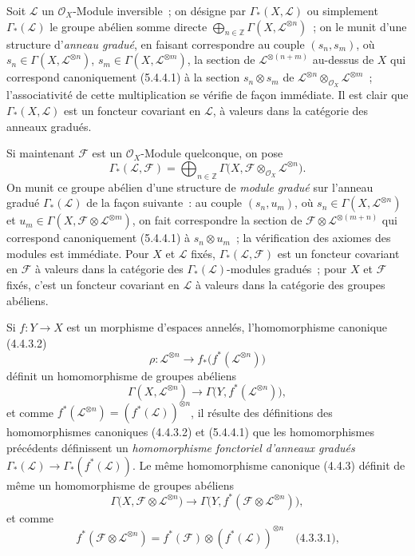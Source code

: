 \begin{env}[5.4.6]
\label{0.5.4.6-fr}
Soit $\mathcal{L}$ un $\mathcal{O}_X$-Module inversible~; on désigne par
$\Gamma_*(X,\mathcal{L})$ ou simplement $\Gamma_*(\mathcal{L})$ le groupe
abélien somme directe
$\bigoplus_{n\in\mathbb{Z}}\Gamma(X,\mathcal{L}^{\otimes n})$~; on le munit
d'une structure d'\emph{anneau gradué}, en faisant correspondre au couple
$(s_n,s_m)$, où $s_n\in\Gamma(X,\mathcal{L}^{\otimes n})$,
$s_m\in\Gamma(X,\mathcal{L}^{\otimes m})$, la section de
$\mathcal{L}^{\otimes(n+m)}$ au-dessus de $X$ qui correspond canoniquement
(5.4.4.1) à la section $s_n\otimes s_m$ de
$\mathcal{L}^{\otimes n}\otimes_{\mathcal{O}_X}\mathcal{L}^{\otimes m}$~;
l'associativité de cette multiplication se vérifie de façon immédiate. Il est
clair que $\Gamma_*(X,\mathcal{L})$ est un foncteur covariant en
$\mathcal{L}$, à valeurs dans la catégorie des anneaux gradués.

Si maintenant $\mathcal{F}$ est un $\mathcal{O}_X$-Module quelconque, on pose
\[
  \Gamma_*(\mathcal{L},\mathcal{F})
  =\bigoplus_{n\in\mathbb{Z}}
   \Gamma\bigl(X,
     \mathcal{F}\otimes_{\mathcal{O}_X}\mathcal{L}^{\otimes n}\bigr).
\]
On munit ce groupe abélien d'une structure de \emph{module gradué} sur
l'anneau gradué $\Gamma_*(\mathcal{L})$ de la façon suivante~: au couple
$(s_n,u_m)$, où $s_n\in\Gamma(X,\mathcal{L}^{\otimes n})$ et
$u_m\in\Gamma(X,
\mathcal{F}\otimes\mathcal{L}^{\otimes m})$, on fait
correspondre la section de
$\mathcal{F}\otimes\mathcal{L}^{\otimes(m+n)}$ qui correspond
canoniquement (5.4.4.1) à $s_n\otimes u_m$~; la vérification des axiomes des
modules est immédiate. Pour $X$ et $\mathcal{L}$ fixés,
$\Gamma_*(\mathcal{L},\mathcal{F})$ est un foncteur covariant en
$\mathcal{F}$ à valeurs dans la catégorie des
$\Gamma_*(\mathcal{L})$-modules gradués~; pour $X$ et $\mathcal{F}$ fixés,
c'est un foncteur covariant en $\mathcal{L}$ à valeurs dans la catégorie des
groupes abéliens.

Si $f:Y\to X$ est un morphisme d'espaces annelés, l'homomorphisme canonique
(4.4.3.2)
\[
  \rho:\mathcal{L}^{\otimes n}
  \longrightarrow
  f_*\bigl(f^*(\mathcal{L}^{\otimes n})\bigr)
\]
définit un homomorphisme de groupes abéliens
\[
  \Gamma(X,\mathcal{L}^{\otimes n})
  \longrightarrow
  \Gamma\bigl(Y,f^*(\mathcal{L}^{\otimes n})\bigr),
\]
et comme
$f^*(\mathcal{L}^{\otimes n})=(f^*(\mathcal{L}))^{\otimes n}$, il résulte des
définitions des homomorphismes canoniques (4.4.3.2) et (5.4.4.1) que les
homomorphismes précédents définissent un \emph{homomorphisme fonctoriel
d'anneaux gradués}
$\Gamma_*(\mathcal{L})\to\Gamma_*(f^*(\mathcal{L}))$. Le même homomorphisme
canonique (4.4.3) définit de même un homomorphisme de groupes abéliens
\[
  \Gamma\bigl(X,
    \mathcal{F}\otimes\mathcal{L}^{\otimes n}\bigr)
  \longrightarrow
  \Gamma\bigl(Y,
    f^*(\mathcal{F}\otimes\mathcal{L}^{\otimes n})\bigr),
\]
et comme
\[
  f^*(\mathcal{F}\otimes\mathcal{L}^{\otimes n})
  =f^*(\mathcal{F})\otimes
   (f^*(\mathcal{L}))^{\otimes n}
  \quad\text{(4.3.3.1),}
\]


\end{env}
